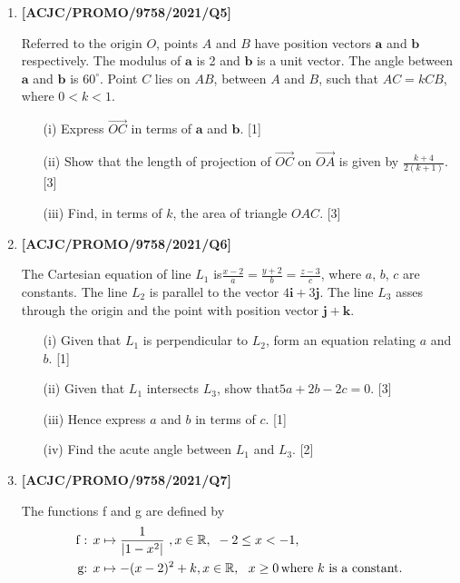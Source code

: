 \documentclass[twoside,english]{article}
\begin{document}
\begin{enumerate}
 \newpage 

\item \textbf{{[}ACJC/PROMO/9758/2021/Q5{]}}

Referred to the origin $O$, points $A$ and $B$ have position vectors
$\mathbf{a}$ and $\mathbf{b}$ respectively. The modulus of $\mathbf{a}$
is 2 and $\mathbf{b}$ is a unit vector. The angle between $\mathbf{a}$
and $\mathbf{b}$ is $60^{\circ}$. Point $C$ lies on $AB$, between
$A$ and $B$, such that $AC=kCB$, where $0<k<1$. 
\begin{enumerate}
\item[(i)]  Express $\overrightarrow{OC}$ in terms of $\mathbf{a}$ and $\mathbf{b}$.
\hfill{}{[}1{]}
\item[(ii)]  Show that the length of projection of $\overrightarrow{OC}$ on
$\overrightarrow{OA}$ is given by $\frac{k+4}{2\left(k+1\right)}$.\hfill{}
{[}3{]}
\item[(iii)]  Find, in terms of $k$, the area of triangle $OAC$.\hfill{} {[}3{]}
\end{enumerate}

 \newpage 

\item \textbf{{[}ACJC/PROMO/9758/2021/Q6{]}}

The Cartesian equation of line $L_{1}$ is$\frac{x-2}{a}=\frac{y+2}{b}=\frac{z-3}{c}$,
where $a$, $b$, $c$ are constants. The line $L_{2}$ is parallel
to the vector $4\mathbf{i}+3\mathbf{j}$. The line $L_{3}$ asses
through the origin and the point with position vector $\mathbf{j}+\mathbf{k}$. 
\begin{enumerate}
\item[(i)]  Given that $L_{1}$ is perpendicular to $L_{2}$, form an equation
relating $a$ and $b$. \hfill{}{[}1{]}
\item[(ii)]  Given that $L_{1}$ intersects $L_{3}$, show that$5a+2b-2c=0$.
\hfill{}{[}3{]}
\item[(iii)]  Hence express $a$ and $b$ in terms of $c$. \hfill{}{[}1{]}
\item[(iv)]  Find the acute angle between $L_{1}$ and $L_{3}$. \hfill{}{[}2{]}
\end{enumerate}

 \newpage 

\item \textbf{{[}ACJC/PROMO/9758/2021/Q7{]}}

The functions f and g are defined by 
\begin{align*}
\text{f : }x & \mapsto\frac{1}{\left|1-x^{2}\right|}\ ,x\in\mathbb{R},\text{ }-2\le x<-1,\\
\text{g: }x & \mapsto-(x-2)^{2}+k,x\in\mathbb{R},\text{ }\ x\ge0\,\text{where \ensuremath{k} is a constant}.
\end{align*}


\end{enumerate}
\end{document}
